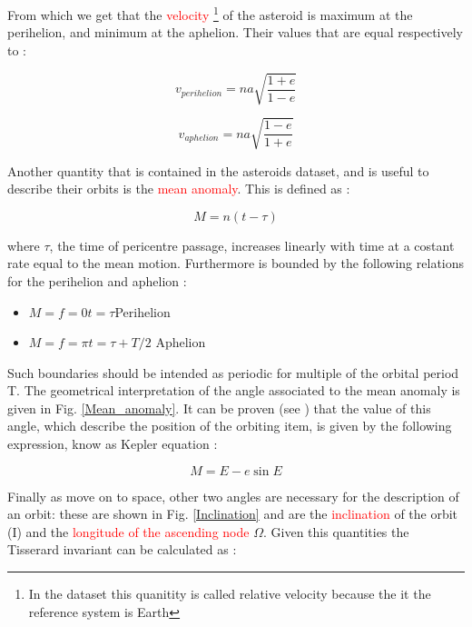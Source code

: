\documentclass[12pt,%
               a4paper,%
               oneside,openany,%
               titlepage,%
               headinclude,footinclude,%
               BCOR5mm,%
               cleardoublepage=empty,%
               tablecaptionabove,%
               floatperchapter,
               ]{scrreprt}                 %
\begin{document}
From which we get that the \textcolor{red}{velocity} \footnote{In the dataset this quanitity is called relative velocity because the it the reference system is Earth} of the asteroid is maximum at the perihelion, and minimum at the aphelion. Their values that are equal respectively to \cite{murray1999solar}:

\begin{equation}
v_{perihelion}=na\sqrt{\dfrac{1+e}{1-e}}
\end{equation}

\begin{equation}
v_{aphelion}=na\sqrt{\dfrac{1-e}{1+e}}
\end{equation}

Another quantity that is contained in the asteroids dataset, and is useful to describe their orbits is the \textcolor{red}{mean anomaly}. This is defined as \cite{murray1999solar}:

\begin{equation}
M=n(t-\tau)
\end{equation}

where $\tau$, the time of pericentre passage, increases linearly with time at a costant rate equal to the mean motion. Furthermore is bounded by the following relations for the perihelion and aphelion \cite{murray1999solar}:

\begin{itemize}
\item $M=f=0$\quad$t=\tau$\quad Perihelion
\item $M=f=\pi$\quad$t=\tau+T/2$ \quad Aphelion
\end{itemize}

Such boundaries should be intended as periodic for multiple of the orbital period T. The geometrical interpretation of the angle associated to the mean anomaly is given in Fig. \ref{Mean_anomaly}. It can be proven (see \cite{murray1999solar}) that the value of this angle, which describe the position of the orbiting item, is given by the following expression, know as Kepler equation \cite{murray1999solar}:

\begin{equation}
M=E-e\sin E
\end{equation}

Finally as move on to space, other two angles are necessary for the description of an orbit: these are shown in Fig. \ref{Inclination} and are the \textcolor{red}{inclination} of the orbit (I) and the \textcolor{red}{longitude of the ascending node} $\Omega$. Given this quantities the Tisserard invariant can be calculated as \cite{murray1999solar}:
\end{document}
